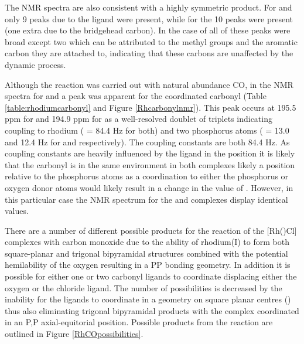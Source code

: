 The \carbon{} NMR spectra are also consistent with a highly symmetric product.  For \tBusixantphos{} and \tButhixantphos{} only 9 peaks due to the ligand were present, while for \tBuxantphos{} the 10 peaks were present (one extra due to the bridgehead carbon).  In the case of \tButhixantphos{} all of these peaks were broad except two which can be attributed to the methyl groups and the aromatic carbon they are attached to, indicating that these carbons are unaffected by the dynamic process.  

Although the reaction was carried out with natural abundance CO, in the \carbon{} NMR spectra for \tBusixantphos{} and \tBuxantphos{} a peak was apparent for the coordinated carbonyl (Table \ref{table:rhodiumcarbonyl} and Figure \ref{Rhcarbonylnmr}).  This peak occurs at 195.5 ppm for \tBusixantphos{} and 194.9 ppm for \tBuxantphos{} as a well-resolved doublet of triplets indicating coupling to rhodium (\JRhC{} = 84.4 Hz for both) and two phosphorus atoms (\JPC{} = 13.0 and 12.4 Hz for \tBusixantphos{} and \tBuxantphos{} respectively).  The \JRhC{} coupling constants are both 84.4 Hz.  As coupling constants are heavily influenced by the ligand in the \trans{} position it is likely that the carbonyl is in the same environment in both complexes likely a \cis{} position relative to the phosphorus atoms as a \trans{} coordination to either the phosphorus or oxygen donor atoms would likely result in a change in the value of \JRhC{}.  However, in this particular case the \phosphorus{} NMR spectrum for the \tBusixantphos{} and \tBuxantphos{} complexes display identical \JRhP{} values.  


There are a number of different possible products for the reaction of the [Rh(\tBuxantphosk)Cl] complexes with carbon monoxide due to the ability of rhodium(I) to form both square-planar and trigonal bipyramidal structures combined with the potential hemilability of the \tBuxantphos{} oxygen resulting in a \dento{}PP\textprime{} bonding geometry.  In addition it is possible for either one or two carbonyl ligands to coordinate displacing either the oxygen or the chloride ligand.  The number of possibilities is decreased by the inability for the \tBuxantphos{} ligands to coordinate in a \cis{} geometry on square planar centres () thus also eliminating trigonal bipyramidal products with the \tBuxantphos{} complex coordinated in an \dento{}P,P\textprime{} axial-equitorial position.  Possible products from the reaction are outlined in Figure \ref{RhCOpossibilities}.

